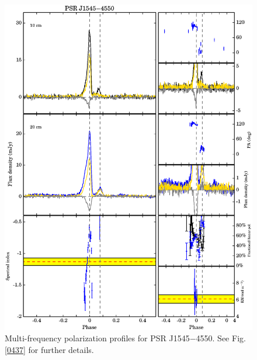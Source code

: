 \documentclass[useAMS,usenatbib]{mn2e}
\begin{document}
\begin{appendix}
\begin{figure}
\begin{center}
\includegraphics[width=6 in]{1545.ps}
\caption{Multi-frequency polarization profiles for PSR J1545$-$4550. 
See Fig. \ref{0437} for further details.}
\label{1545}
\end{center}
\end{figure}


\end{appendix}
\end{document}
